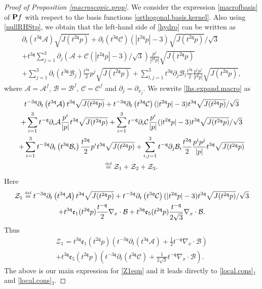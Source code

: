 \documentclass[reqno]{amsart}
\newcommand{\eqdef }{\overset{\mbox{\tiny{def}}}{=}}
\newcommand{\pv}{p}
\newcommand{\qq}{\mathfrak{q}}
\newcommand{\tq}{t^{\qq}}
\newcommand{\tmq}{t^{-\qq}}
\newcommand{\tqq}{t^{2\qq}}
\newcommand{\tTq}{t^{3\qq}}
\newcommand{\tmTq}{t^{-3\qq}}
\newcommand{\macro}{{\bf P}}
\theoremstyle{definition}
\numberwithin{equation}{section}
\numberwithin{theorem}{section}
\begin{document}
\begin{proof}[Proof of Proposition \ref{macroscopic.prop}]
We consider the expression \eqref{macrofbasis} of $\macro f$ with respect to the basis functions \eqref{orthogonal.basis.kernel}. Also using \eqref{nullRHStp}, we obtain that the left-hand side of \eqref{hydro} can be written as
\begin{multline}\label{lhs.expand.macro}
\partial_t \left(\tTq \mathcal{A} \right)\sqrt{J(\tqq\pv)}
+\partial_t \left(\tTq \mathcal{C} \right) ({|\tqq \pv|}-3)\sqrt{J(\tqq\pv)}/\sqrt{3}
\\
+
\tTq\sum_{j=1}^3\partial_j(\mathcal{A}+\mathcal{C}({|\tqq \pv|}-3)/\sqrt{3})\frac{p^j}{{|\tq \pv|}}\sqrt{J(\tqq\pv)}
\\
+\sum_{j=1}^{3}\partial_t \left(\tTq \mathcal{B}_{j} \right) \frac{\tqq}{2} p^j\sqrt{J(\tqq\pv)}
 +
 \sum_{l,j=1}^{3}  \tTq\partial_j \mathcal{B}_{l} \frac{\tqq}{2}\frac{p^lp^j}{{|\tq \pv|}}\sqrt{J(\tqq\pv)},
\end{multline}
where $\mathcal{A}=\mathcal{A}^f$, $\mathcal{B}=\mathcal{B}^f$, $\mathcal{C}=\mathcal{C}^f$ and $\partial_j=\partial_{x_j}$.   We rewrite \eqref{lhs.expand.macro} as
\begin{multline}\label{macroscopeqn}
\tmTq\partial_t \left(\tTq \mathcal{A} \right)\tTq\sqrt{J(\tqq\pv)}
+\tmTq\partial_t \left(\tTq \mathcal{C} \right) ({|\tqq \pv|}-3)\tTq\sqrt{J(\tqq\pv)}/\sqrt{3}
\\
+
\sum_{i=1}^3\tmq\partial_i\mathcal{A}\frac{p^i}{{| \pv|}}\tTq\sqrt{J(\tqq\pv)}
+
\sum_{i=1}^3\tmq\partial_i\mathcal{C}\frac{p^i}{{| \pv|}} ({|\tqq \pv|}-3)\tTq\sqrt{J(\tqq\pv)} /\sqrt{3}
\\
+\sum_{i=1}^{3} \tmTq\partial_t \left(\tTq \mathcal{B}_i \right) \frac{\tqq}{2} p^i \tTq\sqrt{J(\tqq\pv)}
 +
 \sum_{i,j=1}^{3}  \tmq\partial_j \mathcal{B}_i \frac{\tqq}{2}\frac{p^ip^j}{{|\pv|}} \tTq\sqrt{J(\tqq\pv)} 
 \\
 \eqdef \mathcal{Z}_1+\mathcal{Z}_2+\mathcal{Z}_3.
\end{multline}
Here
\begin{multline}\notag
\mathcal{Z}_1 \eqdef 
\tmTq\partial_t \left(\tTq \mathcal{A} \right)\tTq\sqrt{J(\tqq\pv)}
+\tmTq\partial_t \left(\tTq \mathcal{C} \right) ({|\tqq \pv|}-3)\tTq\sqrt{J(\tqq\pv)}/\sqrt{3}
\\
+\tTq \mathfrak{e}_1(\tqq \pv) \frac{\tmq}{2}   \nabla_x \cdot \mathcal{B}
+
\tTq \mathfrak{e}_5(\tqq \pv)\frac{\tmq}{2\sqrt{3}}   \nabla_x \cdot \mathcal{B}.
\end{multline}
Thus
\begin{multline}\label{Z1eqn}
\mathcal{Z}_1 
 =
\tTq \mathfrak{e}_1(\tqq \pv)\left( \tmTq\partial_t \left(\tTq \mathcal{A} \right) +
\frac{1}{2}  \tmq \nabla_x \cdot \mathcal{B} \right)
\\
+
\tTq \mathfrak{e}_5(\tqq \pv)
\left(\tmTq\partial_t \left(\tTq \mathcal{C} \right)   
+
\frac{1}{2\sqrt{3}}  \tmq \nabla_x \cdot \mathcal{B}\right).
\end{multline}
The above is our main expression for \eqref{Z1eqn} and it leads directly to \eqref{local.cons}$_1$ and \eqref{local.cons}$_3$.


\end{proof}
\end{document}
